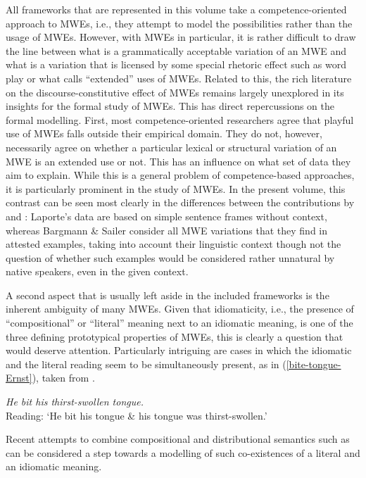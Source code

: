 \documentclass[output=paper]{langsci/langscibook}
\begin{document}
All frameworks that are represented in this volume take a competence-oriented approach to MWEs, i.e., they attempt to model the possibilities rather than the usage of MWEs. 
However, with MWEs in particular, it is rather difficult to draw the line between what is a grammatically acceptable variation of an MWE and what is a variation that is licensed by some special rhetoric effect such as word play or what \citet{Egan:08} calls “extended” uses of MWEs. 
Related to this, the rich literature on the discourse-constitutive effect of MWEs remains largely unexplored in its insights for the formal study of MWEs. 
This has direct repercussions on the formal modelling. First, most competence-oriented researchers agree that playful use of MWEs falls outside their empirical domain. 
They do not, however, necessarily agree on whether a particular lexical or structural variation of an MWE is an extended use or not. This has an influence on what set of data they aim to explain. 
While this is a general problem of competence-based approaches, it is particularly prominent in the study of MWEs. 
In the present volume, this contrast can be seen most clearly in the differences between the contributions by \citeauthor{Laporte2018tv} and 
\citeauthor{BargmannSailer2018tv}: Laporte’s data are based on simple sentence frames without context, whereas Bargmann \& Sailer consider all MWE variations that they find in attested examples, taking into account their linguistic context though not the question of whether such examples would be considered rather unnatural by native speakers, even in the given context.

A second aspect that is usually left aside in the included frameworks is the inherent ambiguity of many MWEs. Given that  idiomaticity, i.e., the presence of ``compositional” or ``literal” meaning next to an idiomatic meaning, is one of the three defining prototypical properties of MWEs, this is clearly a question that would deserve attention. 
Particularly intriguing  are cases in which the idiomatic and the literal reading seem to be simultaneously present, as in (\ref{bite-tongue-Ernst}), taken from \citet{Ernst:81}. 

\ea \label{bite-tongue-Ernst} 
\textit{He bit his thirst-swollen tongue.}\\
Reading: `He bit his tongue \& his tongue was thirst-swollen.'
\z

Recent attempts to combine compositional and distributional semantics such as  \citet{Gehrke:McNally:16} can be considered a step towards a modelling of such co-existences of a literal and an idiomatic meaning.
\end{document}
